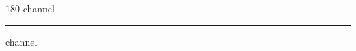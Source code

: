 
\begin{frame}
\begin{center}
\begin{turn}{180}
{\fontsize{2.5cm}{1em}\selectfont channel}
\end{turn}
\vspace{1em}\par  
\hrule
\vspace{1em}\par  
{\fontsize{2.5cm}{1em}\selectfont channel}
\end{center}
\end{frame}
